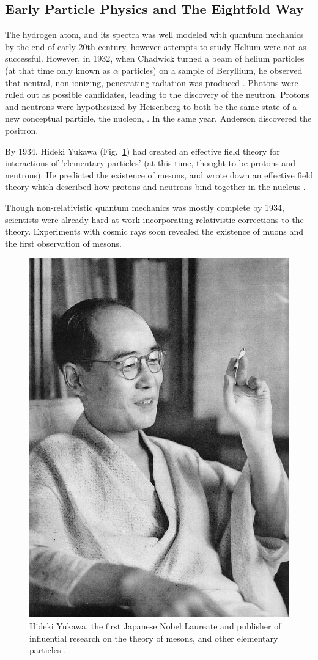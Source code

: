 \clearpage
\subsection{Early Particle Physics and The Eightfold Way}

The hydrogen atom, and its spectra was well modeled with quantum mechanics by
the end of early 20th century, however attempts to study Helium were not as
successful. However, in 1932,  when Chadwick turned a beam of
helium particles (at that time only known as $\alpha$ particles) on a sample of
Beryllium, he observed that neutral, non-ionizing, penetrating radiation was
produced  \cite{Krauss2015}. Photons were ruled out as possible
candidates, leading to the discovery of the neutron. Protons and neutrons were
hypothesized by Heisenberg to both be the same state of a new conceptual
particle, the nucleon,  \cite{Heisenberg1952}. In the same year, Anderson
discovered the positron. 

By 1934, Hideki Yukawa (Fig.~\ref{fig:hidekiyukawa}) had created an effective
field theory for interactions of 'elementary particles' (at this time, thought
to be protons and neutrons). He predicted the existence of mesons, and wrote
down an effective field theory which described how protons and neutrons bind
together in the nucleus \cite{Yukawa1935}. 

Though non-relativistic quantum mechanics was mostly complete by 1934,
scientists were already hard at work incorporating relativistic corrections to
the theory. Experiments with cosmic rays soon revealed the existence of muons
and the first observation of mesons.

\begin{figure}[ht]
	\begin{center}
		\includegraphics[width=0.5\linewidth]{./figures/hidekiyukawa.jpg}
		\caption{
			Hideki Yukawa, the first Japanese Nobel Laureate and publisher of
			influential research on the theory of mesons, and other elementary
			particles  \cite{YukawaPhoto1952}.
		}
		\label{fig:hidekiyukawa}
	\end{center}
\end{figure}

